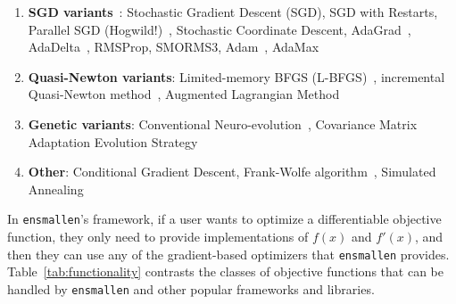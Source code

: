 \documentclass{article}
\begin{document}

\vspace*{-0.4em}
\begin{enumerate}[{~~~$\bullet$}]
\small
  \item {\bf SGD variants}~\cite{Ruder_2016}:  %
      Stochastic Gradient Descent (SGD),
      SGD with Restarts,
      Parallel SGD (Hogwild!)~\cite{hogwild_nips_2011},
      Stochastic Coordinate Descent, 
      AdaGrad~\cite{Duchi_2011},
      AdaDelta~\cite{Zeiler_2012},
      RMSProp,
      SMORMS3,
      Adam~\cite{kingma2015adam},
      AdaMax

  \item {\bf Quasi-Newton variants}:
      Limited-memory BFGS (L-BFGS)~\cite{zhu1997algorithm},
      incremental Quasi-Newton method~\cite{Mokhtari_2018},
      Augmented Lagrangian Method~\cite{Hestenes_1969}

  \item {\bf Genetic variants}:
      Conventional Neuro-evolution~\cite{Belew_1990},
      Covariance Matrix Adaptation Evolution Strategy~\cite{Hansen_2001}

  \item {\bf Other}:
    Conditional Gradient Descent,
    Frank-Wolfe algorithm~\cite{Frank_1956},
    Simulated Annealing~\cite{kirkpatrick1983optimization}

\end{enumerate}

In {\tt ensmallen}'s framework, if a user wants to optimize a differentiable objective
function, they only need to provide implementations of $f(x)$ and $f'(x)$, and
then they can use any of the gradient-based optimizers that {\tt ensmallen}
provides.  Table~\ref{tab:functionality} contrasts 
the classes of objective functions that can be handled by {\tt ensmallen}
and other popular frameworks and libraries.
\end{document}
